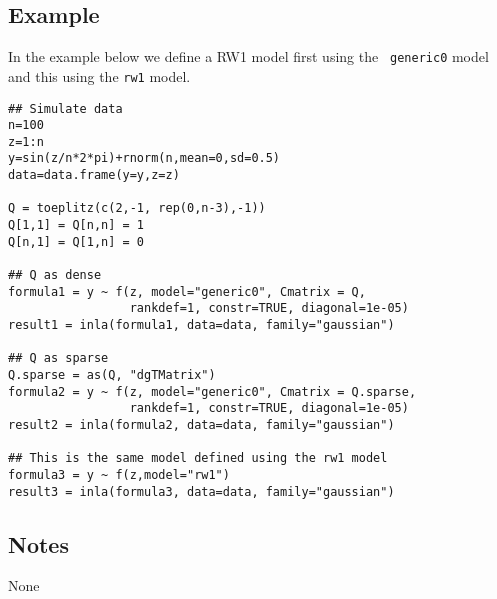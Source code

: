 \documentclass[a4paper,11pt]{article}
\begin{document}
\subsection*{Example}
In the example below we define a RW1 model first using the {\tt
    generic0} model and this using the {\tt rw1} model.
\begin{verbatim}
## Simulate data
n=100
z=1:n
y=sin(z/n*2*pi)+rnorm(n,mean=0,sd=0.5)
data=data.frame(y=y,z=z)

Q = toeplitz(c(2,-1, rep(0,n-3),-1))
Q[1,1] = Q[n,n] = 1
Q[n,1] = Q[1,n] = 0

## Q as dense
formula1 = y ~ f(z, model="generic0", Cmatrix = Q,
                 rankdef=1, constr=TRUE, diagonal=1e-05)
result1 = inla(formula1, data=data, family="gaussian")

## Q as sparse
Q.sparse = as(Q, "dgTMatrix")
formula2 = y ~ f(z, model="generic0", Cmatrix = Q.sparse,
                 rankdef=1, constr=TRUE, diagonal=1e-05)
result2 = inla(formula2, data=data, family="gaussian")

## This is the same model defined using the rw1 model
formula3 = y ~ f(z,model="rw1")
result3 = inla(formula3, data=data, family="gaussian")

\end{verbatim}

\subsection*{Notes}
None
\end{document}
